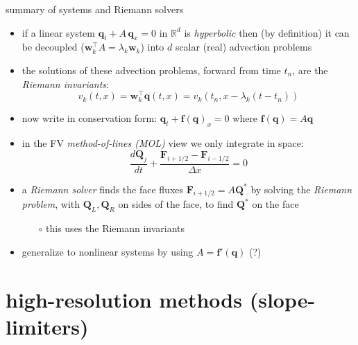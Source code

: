 \documentclass[10pt,dvipsnames,usepdftitle=false,
hyperref={pdftitle = {Finite volume methods},
    pdfauthor = {Ed Bueler}}]{beamer}
\newcommand{\bbf}{\mathbf{f}}
\newcommand{\bq}{\mathbf{q}}
\newcommand{\bw}{\mathbf{w}}
\newcommand{\bF}{\mathbf{F}}
\newcommand{\bQ}{\mathbf{Q}}
\newcommand{\RR}{\mathbb{R}}
\begin{document}
\begin{frame}{summary of systems and Riemann solvers}

\begin{itemize}
\item if a linear system $\bq_t + A\, \bq_x=0$ in $\RR^d$ is \alert{\emph{hyperbolic}} then (by definition) it can be decoupled ($\bw_k^\top A = \lambda_k \bw_k$) into $d$ scalar (real) advection problems
\item the solutions of these advection problems, forward from time $t_n$, are the \alert{\emph{Riemann invariants}}:
    $$v_k(t,x) = \bw_k^\top \bq(t,x) = v_k(t_n,x-\lambda_k (t-t_n))$$
\item now write in conservation form: $\bq_t + \bbf(\bq)_x=0$ where $\bbf(\bq) = A\bq$
\item in the FV \alert{\emph{method-of-lines (MOL)}} view we only integrate in space:
    $$\frac{d\bQ_j}{dt} + \frac{\bF_{i+1/2} - \bF_{i-1/2}}{\Delta x} = 0$$
\item a \alert{\emph{Riemann solver}} finds the face fluxes $\bF_{i+1/2}=A \bQ^*$ by solving the \emph{Riemann problem}, with $\bQ_L,\bQ_R$ on sides of the face, to find $\bQ^*$ on the face
    \begin{itemize}
    \item[$\circ$] this uses the Riemann invariants
    \end{itemize}
\item generalize to nonlinear systems by using $A=\bbf'(\bq)$ \quad (?)
\end{itemize}
\end{frame}


\section{high-resolution methods (slope-limiters)}
\end{document}
